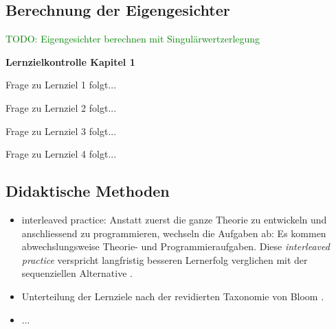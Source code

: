 \subsection{Berechnung der Eigengesichter}
\textcolor{green}{TODO: Eigengesichter berechnen mit Singulärwertzerlegung}\\

\begin{tcolorbox}
	\centerline{\textbf{Lernzielkontrolle Kapitel 1}}
	\begin{aufgabe}
		Frage zu Lernziel 1 folgt...
	\end{aufgabe}
	\begin{aufgabe}
		Frage zu Lernziel 2 folgt...
	\end{aufgabe}
	\begin{aufgabe}
		Frage zu Lernziel 3 folgt...
	\end{aufgabe}
	\begin{aufgabe}
		Frage zu Lernziel 4 folgt...
	\end{aufgabe}
\end{tcolorbox}

\subsection{Didaktische Methoden}
\begin{itemize}
	\item interleaved practice: Anstatt zuerst die ganze Theorie zu entwickeln und anschliessend zu programmieren, wechseln die Aufgaben ab: Es kommen abwechslungsweise Theorie- und Programmieraufgaben.
	Diese \textit{interleaved practice} verspricht langfristig besseren Lernerfolg verglichen mit der sequenziellen Alternative \cite{Rohrer14}.
	\item Unterteilung der Lernziele nach der revidierten Taxonomie von Bloom \cite{Anderson2001}.
	\item ...
\end{itemize}